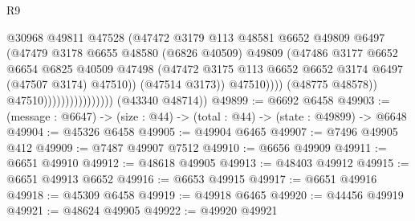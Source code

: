 \begin{lexlean}{R9}
\begin{coremodule}
                                              @30968
                                              @49811
                                              @47528
                                              (@47472
                                                @3179
                                                @113
                                                @48581
                                                @6652
                                                @49809
                                                @6497
                                                (@47479
                                                  @3178
                                                  @6655
                                                  @48580
                                                  (@6826 @40509)
                                                  @49809
                                                  (@47486
                                                    @3177
                                                    @6652
                                                    @6654
                                                    @6825
                                                    @40509
                                                    @47498
                                                    (@47472
                                                      @3175
                                                      @113
                                                      @6652
                                                      @6652
                                                      @3174
                                                      @6497
                                                      (@47507 @3174)
                                                      @47510))
                                                  (@47514 @3173))
                                                @47510))))
                                        (@48775 @48578))
                                      @47510))))))))))))))))
      (@43340 @48714))
@49899 := @6692 @6458
@49903 := (message : @6647) -> (size : @44) -> (total : @44) -> (state : @49899) -> @6648
@49904 := @45326 @6458
@49905 := @49904 @6465
@49907 := @7496 @49905 @412
@49909 := @7487 @49907 @7512
@49910 := @6656 @49909
@49911 := @6651 @49910
@49912 := @48618 @49905
@49913 := @48403 @49912
@49915 := @6651 @49913 @6652
@49916 := @6653 @49915
@49917 := @6651 @49916
@49918 := @45309 @6458
@49919 := @49918 @6465
@49920 := @44456 @49919
@49921 := @48624 @49905
@49922 := @49920 @49921

\end{coremodule}
\end{lexlean}
